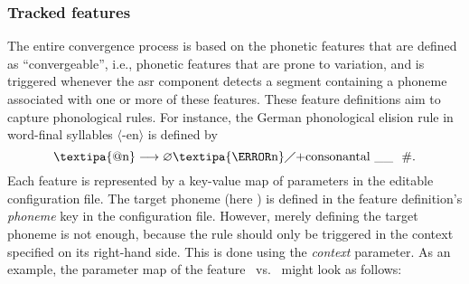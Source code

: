 \subsubsection{Tracked features}
\label{subsubsec:tracked_features}


The entire convergence process is based on the phonetic features that are defined as \enquote{convergeable}, i.e., phonetic features that are prone to variation, and is triggered whenever the \ac{asr} component detects a segment containing a phoneme associated with one or more of these features.
These feature definitions aim to capture phonological rules.
For instance, the German phonological  elision rule in word-final syllables $\langle$-en$\rangle$ is defined by \citep[adapted from][pp.\,142--143]{Benware1986phonetics}
%
\begin{equation}
	\text{\textipa{@n}}\longrightarrow \varnothing \text{\textipa{\s{n}}} \diagup
	\text{+consonantal} \ \_\_ \ \ \text{\#} .
	\label{eq:elision_rule}
\end{equation}
%
Each feature is represented by a key-value map of parameters in the editable configuration file.
The target phoneme (here ) is defined in the feature definition's \emph{phoneme} key in the configuration file.
However, merely defining the target phoneme is not enough, because the rule should only be triggered in the context specified on its right-hand side.
This is done using the \emph{context} parameter.
As an example, the parameter map of the feature \textipa{[E:]}~vs.~\textipa{[e:]} might look as follows:

